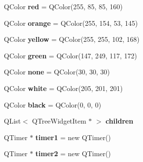 \begin{DoxyCompactItemize}
\item 
Q\+Color {\bfseries red} = Q\+Color(255, 85, 85, 160)\hypertarget{class_f_s_w_item_a95ced7f596fe9cb5d8664ec78d19f1c4}{}\label{class_f_s_w_item_a95ced7f596fe9cb5d8664ec78d19f1c4}

\item 
Q\+Color {\bfseries orange} = Q\+Color(255, 154, 53, 145)\hypertarget{class_f_s_w_item_a8c3e75732efc779eecb1ddf917e2ac22}{}\label{class_f_s_w_item_a8c3e75732efc779eecb1ddf917e2ac22}

\item 
Q\+Color {\bfseries yellow} = Q\+Color(255, 255, 102, 168)\hypertarget{class_f_s_w_item_a105e2f7856344cf2d5a2e55b52d9774e}{}\label{class_f_s_w_item_a105e2f7856344cf2d5a2e55b52d9774e}

\item 
Q\+Color {\bfseries green} = Q\+Color(147, 249, 117, 172)\hypertarget{class_f_s_w_item_a202a326db3907990197f73cf3ccbb309}{}\label{class_f_s_w_item_a202a326db3907990197f73cf3ccbb309}

\item 
Q\+Color {\bfseries none} = Q\+Color(30, 30, 30)\hypertarget{class_f_s_w_item_a63323f688160ea6bd847add899c3cf9f}{}\label{class_f_s_w_item_a63323f688160ea6bd847add899c3cf9f}

\item 
Q\+Color {\bfseries white} = Q\+Color(205, 201, 201)\hypertarget{class_f_s_w_item_a7cbb793761fa42eb155bc1cf9ba20c41}{}\label{class_f_s_w_item_a7cbb793761fa42eb155bc1cf9ba20c41}

\item 
Q\+Color {\bfseries black} = Q\+Color(0, 0, 0)\hypertarget{class_f_s_w_item_aae0025b90a36ae919448e7ba51601258}{}\label{class_f_s_w_item_aae0025b90a36ae919448e7ba51601258}

\item 
Q\+List$<$ Q\+Tree\+Widget\+Item $\ast$ $>$ {\bfseries children}\hypertarget{class_f_s_w_item_ae5c3a8e3bbf01dc07ef3c7d39838fb38}{}\label{class_f_s_w_item_ae5c3a8e3bbf01dc07ef3c7d39838fb38}

\item 
Q\+Timer $\ast$ {\bfseries timer1} = new Q\+Timer()\hypertarget{class_f_s_w_item_a6e6d442fadc7aeae3849208aa3470301}{}\label{class_f_s_w_item_a6e6d442fadc7aeae3849208aa3470301}

\item 
Q\+Timer $\ast$ {\bfseries timer2} = new Q\+Timer()\hypertarget{class_f_s_w_item_ab6a9b04aaabcfd50e9cf04e7d235f1f4}{}\label{class_f_s_w_item_ab6a9b04aaabcfd50e9cf04e7d235f1f4}


\end{DoxyCompactItemize}
